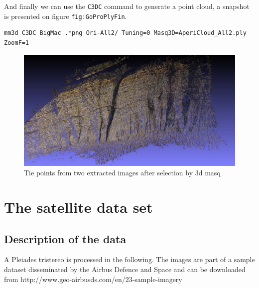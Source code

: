 And finally we can use the {\tt C3DC} command to generate a point cloud, a snapshot is presented on figure {\tt fig:GoProPlyFin}.

\begin{verbatim}
mm3d C3DC BigMac .*png Ori-All2/ Tuning=0 Masq3D=AperiCloud_All2.ply ZoomF=1
\end{verbatim}

\begin{figure}
\centering
\includegraphics[width=0.90\linewidth]{FIGS/GoProVideo/PLY-Climb00.jpg}
\caption{Tie points from  two extracted images after selection by $3$d masq}
\label{fig:GoProPlyFin}
\end{figure}
\section{The satellite data set}\label{sec:usecase:satel}
%
\subsection{Description of the data}
%
A Pleiades tristereo is processed in the following. The images are part of a sample dataset disseminated by the Airbus Defence and Space and can be downloaded from http://www.geo-airbusds.com/en/23-sample-imagery 
